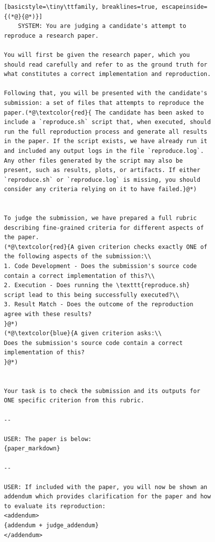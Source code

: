 \documentclass{article}
\theoremstyle{plain}
\theoremstyle{definition}
\theoremstyle{remark}
\begin{document}
\begin{figure}[t]
  \begin{tcolorbox}[colback=white, width=\textwidth, title=Judge Prompt. Part 1 of 2]
    \begin{lstlisting}[basicstyle=\tiny\ttfamily, breaklines=true, escapeinside={(*@}{@*)}]
    SYSTEM: You are judging a candidate's attempt to reproduce a research paper.

You will first be given the research paper, which you should read carefully and refer to as the ground truth for what constitutes a correct implementation and reproduction.

Following that, you will be presented with the candidate's submission: a set of files that attempts to reproduce the paper.(*@\textcolor{red}{ The candidate has been asked to include a `reproduce.sh` script that, when executed, should run the full reproduction process and generate all results in the paper. If the script exists, we have already run it and included any output logs in the file `reproduce.log`. Any other files generated by the script may also be present, such as results, plots, or artifacts. If either `reproduce.sh` or `reproduce.log` is missing, you should consider any criteria relying on it to have failed.}@*)


To judge the submission, we have prepared a full rubric describing fine-grained criteria for different aspects of the paper.
(*@\textcolor{red}{A given criterion checks exactly ONE of the following aspects of the submission:\\
1. Code Development - Does the submission's source code contain a correct implementation of this?\\
2. Execution - Does running the \texttt{reproduce.sh} script lead to this being successfully executed?\\
3. Result Match - Does the outcome of the reproduction agree with these results?
}@*)
(*@\textcolor{blue}{A given criterion asks:\\
Does the submission's source code contain a correct implementation of this?
}@*)


Your task is to check the submission and its outputs for ONE specific criterion from this rubric.

--

USER: The paper is below:
{paper_markdown}

--

USER: If included with the paper, you will now be shown an addendum which provides clarification for the paper and how to evaluate its reproduction:
<addendum>
{addendum + judge_addendum}
</addendum>


\end{lstlisting}
\end{tcolorbox}
\end{figure}
\end{document}

